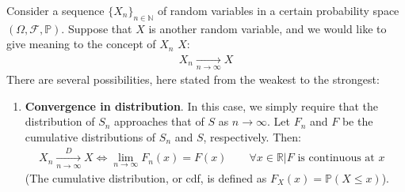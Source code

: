 \documentclass[../template.tex]{subfiles}
\begin{document}
Consider a sequence $\{X_n\}_{n\in \mathbb{N}}$ of random variables in a certain probability space $(\Omega, \mathcal{F}, \mathbb{P})$. Suppose that $X$ is another random variable, and we would like to give meaning to the concept of $X_n$  $X$:
\begin{align*}
    X_n  \xrightarrow[n \to \infty]{} X
\end{align*}
There are several possibilities, here stated from the weakest to the strongest:
\begin{enumerate}
    \item \textbf{Convergence in distribution}. In this case, we simply require that the distribution of $S_n$ approaches that of $S$ as $n \to\infty$. Let $F_n$ and $F$ be the cumulative distributions of $S_n$ and $S$, respectively. Then:
    \begin{align*}
        X_n \xrightarrow[n \to \infty]{D} X \Leftrightarrow \lim_{n \to \infty} F_n(x) = F(x) \qquad \forall x \in \mathbb{R} |  F \text{ is continuous at $x$ }
    \end{align*}  
    (The cumulative distribution, or cdf, is defined as $F_X(x) = \mathbb{P}(X \leq x)$).


\end{enumerate}
\end{document}
